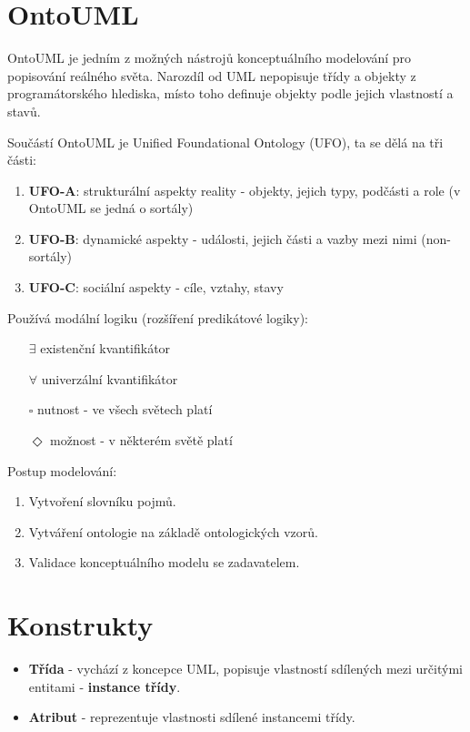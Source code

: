 \documentclass{szzclass}
\begin{document}
\section{OntoUML}
OntoUML je jedním z možných nástrojů konceptuálního modelování pro popisování reálného světa. Narozdíl od UML nepopisuje třídy a objekty z programátorského hlediska, místo toho definuje objekty podle jejich vlastností a stavů.

Součástí OntoUML je Unified Foundational Ontology (UFO), ta se dělá na tři části:
\begin{enumerate}
  \item \textbf{UFO-A}: strukturální aspekty reality - objekty, jejich typy, podčásti a role (v OntoUML se jedná o sortály)
  \item \textbf{UFO-B}: dynamické aspekty - události, jejich části a vazby mezi nimi (non-sortály)
  \item \textbf{UFO-C}: sociální aspekty - cíle, vztahy, stavy
\end{enumerate}

Používá modální logiku (rozšíření predikátové logiky):
\begin{itemize}
  \item[$\exists$] existenční kvantifikátor
  \item[$\forall$] univerzální kvantifikátor
  \item[$\square$] nutnost - ve všech světech platí
  \item[$\Diamond$] možnost - v některém světě platí
\end{itemize}

Postup modelování:
\begin{enumerate}
\item Vytvoření slovníku pojmů.
\item Vytváření ontologie na základě ontologických vzorů.
\item Validace konceptuálního modelu se zadavatelem.
\end{enumerate}

\section{Konstrukty}

\begin{itemize}
\item \textbf{Třída} - vychází z koncepce UML, popisuje vlastností sdílených mezi určitými entitami - \textbf{instance třídy}.
\item \textbf{Atribut} - reprezentuje vlastnosti sdílené instancemi třídy.
\end{itemize}
\end{document}
